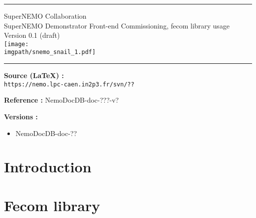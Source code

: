 \documentclass[12pt,a4paper]{article}
\date{\small{\today}}
\newcommand{\thepath}{.}
\newcommand{\imgpath}{\thepath/img}
\begin{document}
\hrule
\begin{center}
{\Large
SuperNEMO Collaboration \\
SuperNEMO Demonstrator Front-end Commissioning, fecom library usage\\
Version 0.1 (draft)\\
}
\vskip 13pt
\texttt{[image: \\imgpath/snemo\_snail\_1.pdf]}
\end{center}
\hrule
\vskip 25pt
\normalsize
\thispagestyle{empty}

\begin{abstract}
This document aims to describe the usage of the Front-end Commissioning (fecom) library
for the SuperNEMO experiment.
\end{abstract}
\vfill
\par\noindent \textbf{Source (LaTeX) : }\\
\texttt{https://nemo.lpc-caen.in2p3.fr/svn/??}
\par\noindent \textbf{Reference :} NemoDocDB-doc-???-v?
\pagebreak
\par\noindent \textbf{Versions :}
\begin{itemize}
\item NemoDocDB-doc-??
\end{itemize}

\pagebreak

\tableofcontents \label{toc}

\pagebreak

\newpage

\section{Introduction}

\section{Fecom library}

\subsection{} 
\end{document}
